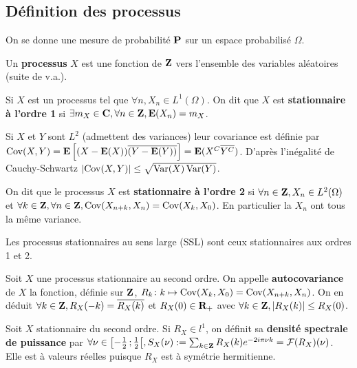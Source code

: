 \subsection{Définition des processus}

	On se donne une mesure de probabilité $\mathbf{P}$ sur un espace probabilisé $\Omega$.
	
	\begin{defn}
		Un \textbf{processus} $X$ est une fonction de $\mathbf{Z}$ vers l'ensemble des variables aléatoires (suite de v.a.).
	\end{defn}
	
	\begin{defn}
		Si $X$ est un processus tel que $\forall n, X_n \in L^1(\Omega)$.
		On dit que $X$ est \textbf{stationnaire à l'ordre 1} si $\exists m_X \in \mathbf{C}, \forall n \in \mathbf{Z}, \mathbf{E}(X_n) = m_X$.
	\end{defn}
	
	\begin{defn}
		Si $X$ et $Y$ sont $L^2$ (admettent des variances) leur covariance est définie par
		$\operatorname{Cov}(X,Y) = \mathbf{E} \left[ (X - \mathbf{E}(X)) \overline{(Y - \mathbf{E}(Y))} \right] = \mathbf{E}(X^C \overline{Y^C})$.
		D'après l'inégalité de Cauchy-Schwartz $\left\lvert\operatorname{Cov}(X,Y)\right\rvert \leq \sqrt{\operatorname{Var}(X) \operatorname{Var}(Y)}$.
	\end{defn}
	
	\begin{defn}
		On dit que le processus $X$ est \textbf{stationnaire à l'ordre 2} si $\forall n \in \mathbf{Z}, X_n \in L^2(\Omega)$ et
		$\forall k \in \mathbf{Z}, \forall n \in \mathbf{Z}, \operatorname{Cov}(X_{n + k},X_n) = \operatorname{Cov}(X_k,X_0)$.
		En particulier la $X_n$ ont tous la même variance.
	\end{defn}
	
	\begin{defn}
		Les processus stationnaires au sens large (SSL) sont ceux stationnaires aux ordres 1 et 2.
	\end{defn}
	
	\begin{defn}
		Soit $X$ une processus stationnaire au second ordre.
		On appelle \textbf{autocovariance} de $X$ la fonction, définie sur $\mathbf{Z}$, $R_k \colon k \mapsto \operatorname{Cov}(X_k,X_0) = \operatorname{Cov}(X_{n + k},X_n)$.
		On en déduit $\forall k \in \mathbf{Z}, R_X(-k) = \overline{R_X(k)}$ et $R_X(0) \in \mathbf{R}_+$ avec
		$\forall k \in \mathbf{Z}, \left\lvert R_X(k)\right\rvert \leq R_X(0)$.
	\end{defn}
	
	\begin{defn}
		Soit $X$ stationnaire du second ordre.
		Si $R_X \in l^1$, on définit sa \textbf{densité spectrale de puissance} par $\forall \nu \in \mathopen{}\mathclose{\left[-\frac{1}{2}\mathclose{}\mathpunct{};\frac{1}{2}\right[}, S_X(\nu) := \sum_{k \in \mathbf{Z}} R_X(k) e^{-2i\pi \nu k} = \mathcal{F}(R_X)(\nu)$.
		Elle est à valeurs réelles puisque $R_X$ est à symétrie hermitienne.
	\end{defn}
	
